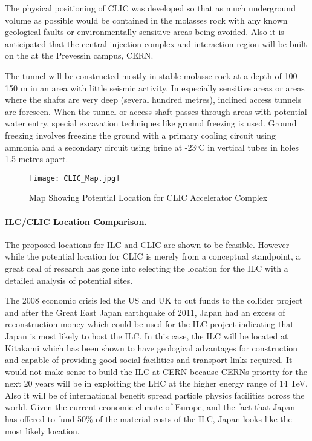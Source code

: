The physical positioning of CLIC was developed so that as much underground volume as possible would be contained in the molasses rock with any known geological faults or environmentally sensitive areas being avoided. Also it is anticipated that the central injection complex and interaction region will be built on the at the Prevessin campus, CERN.

The tunnel will be constructed mostly in stable molasse rock at a depth of 100–150 m in an area with little seismic activity. In especially sensitive areas or areas where the shafts are very deep (several hundred metres), inclined access tunnels are foreseen. When the tunnel or access shaft passes through areas with potential water entry, special excavation techniques like ground freezing is used. Ground freezing involves freezing the ground with a primary cooling circuit using ammonia and a secondary circuit using brine at -23ᵒC in vertical tubes in holes 1.5 metres apart.

\begin{figure}[!htb]
\centering
\texttt{[image: CLIC\_Map.jpg]}
\caption{Map Showing Potential Location for CLIC Accelerator Complex \cite{CLIC:Concept}}
\end{figure}

\paragraph{ILC/CLIC Location Comparison.}

The proposed locations for ILC and CLIC are shown to be feasible. However while the potential location for CLIC is merely from a conceptual standpoint, a great deal of research has gone into selecting the location for the ILC with a detailed analysis of potential sites.

The 2008 economic crisis led the US and UK to cut funds to the collider project and after the Great East Japan earthquake of 2011, Japan had an excess of reconstruction money which could be used for the ILC project indicating that Japan is most likely to host the ILC. In this case, the ILC will be located at Kitakami which has been shown to have geological advantages for construction and capable of providing good social facilities and transport links required. It would not make sense to build the ILC at CERN because CERNs priority for the next 20 years will be in exploiting the LHC at the higher energy range of 14 TeV. Also it will be of international benefit spread particle physics facilities across the world. Given the current economic climate of Europe, and the fact that Japan has offered to fund 50\% of the material costs of the ILC, Japan looks like the most likely location.
 
